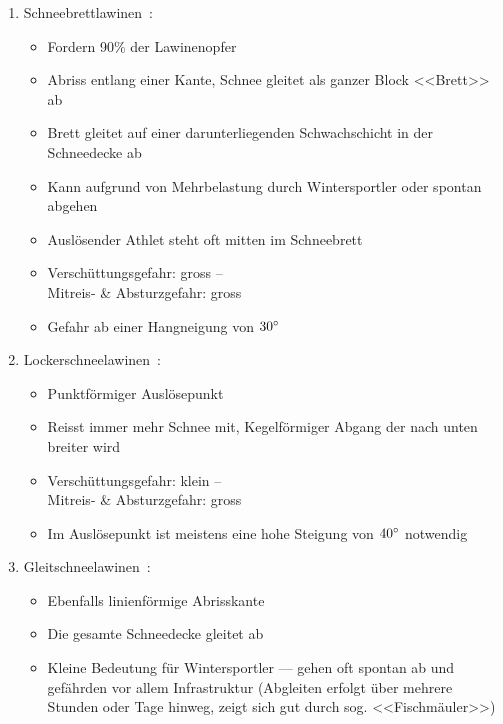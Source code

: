 \begin{enumerate}
  \item Schneebrettlawinen~\cite{harveyrhynerschweizerlawinenkunde}\cite{sacbergspwinter}\cite{slfLawinentypen}:
  \begin{itemize}
    \item Fordern 90\% der Lawinenopfer
    \item Abriss entlang einer Kante, Schnee gleitet als ganzer Block <<Brett>> ab
    \item Brett gleitet auf einer darunterliegenden Schwachschicht in der Schneedecke ab
    \item Kann aufgrund von Mehrbelastung durch Wintersportler oder spontan abgehen
    \item Auslösender Athlet steht oft mitten im Schneebrett
    \item Verschüttungsgefahr: gross –\\ Mitreis- \& Absturzgefahr: gross
    \item Gefahr ab einer Hangneigung von $30\degree$
  \end{itemize}
    
  \item Lockerschneelawinen~\cite{harveyrhynerschweizerlawinenkunde}\cite{sacbergspwinter}\cite{slfLawinentypen}:
  \begin{itemize}
    \item Punktförmiger Auslösepunkt
    \item Reisst immer mehr Schnee mit, Kegelförmiger Abgang der nach unten breiter wird
    \item Verschüttungsgefahr: klein –\\ Mitreis- \& Absturzgefahr: gross
    \item Im Auslösepunkt ist meistens eine hohe Steigung von $40\degree$ notwendig
  \end{itemize}

  \item Gleitschneelawinen~\cite{harveyrhynerschweizerlawinenkunde}\cite{sacbergspwinter}\cite{slfLawinentypen}:
  \begin{itemize}
    \item Ebenfalls linienförmige Abrisskante
    \item Die gesamte Schneedecke gleitet ab
    \item Kleine Bedeutung für Wintersportler –-- gehen oft spontan ab und gefährden vor allem Infrastruktur (Abgleiten erfolgt über mehrere Stunden oder Tage hinweg, zeigt sich gut durch sog. <<Fischmäuler>>)
  \end{itemize}
\end{enumerate}
